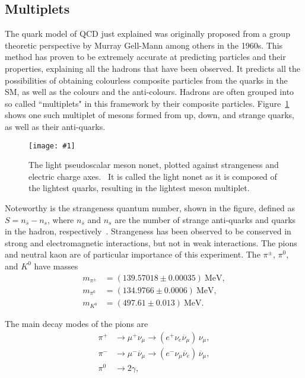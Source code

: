 \documentclass[twocolumn]{article}
\newcommand{\insertFigure}[1]{%
   \texttt{[image: \#1]}%
}
\begin{document}
\subsection{Multiplets}
The quark model of QCD just explained was originally proposed from a group theoretic perspective by Murray Gell-Mann among others in the 1960s. This method has proven to be extremely accurate at predicting particles and their properties, explaining all the hadrons that have been observed. It predicts all the possibilities of obtaining colourless composite particles from the quarks in the SM, as well as the colours and the anti-colours. Hadrons are often grouped into so called ``multiplets" in this framework by their composite particles. Figure~\ref{fig:pseudo} shows one such multiplet of mesons formed from up, down, and strange quarks, as well as their anti-quarks. 
\begin{figure}[!h]
	\centering
	\insertFigure{pseudo.png}
	\caption{The light pseudoscalar meson nonet, plotted against strangeness and electric charge axes.~\cite{pseudo} It is called the light nonet as it is composed of the lightest quarks, resulting in the lightest meson multiplet.}
	\label{fig:pseudo}
\end{figure}
Noteworthy is the strangeness quantum number, shown in the figure, defined as $S = n_{\bar{s}} - n_s$, where $n_{\bar{s}}$ and $n_s$ are the number of strange anti-quarks and quarks in the hadron, respectively~\cite{Thompson}. Strangeness has been observed to be conserved in strong and electromagnetic interactions, but not in weak interactions. The pions and neutral kaon are of particular importance of this experiment. The $\pi^{\pm}$, $\pi^0$, and $K^0$ have masses~\cite{pdg}
\begin{align*} %
m_{\pi^{\pm}} &= (139.57018 \pm 0.00035)~\text{MeV}, \\
m_{\pi^0} &= (134.9766 \pm 0.0006)~\text{MeV}, \\
m_{K^0} & = (497.61 \pm 0.013)~\text{MeV}.
\end{align*}
\iffalse
and mean lifetimes
\begin{align*} %
\tau_{\pi^{\pm}} &= (2.6033 \pm 0.0005)\times 10^{-8}~\text{s}, \\
\tau_{\pi^0} &= (8.52 \pm 0.18)\times 10^{-8}~\text{s}.
\end{align*}
Their main decay modes are 
\fi
The main decay modes of the pions are 
\begin{align*} %
\pi^+ &\to \mu^+ \nu_\mu \to (e^+ \nu_e \overline{\nu}_{\mu}) \, \nu_\mu, \\
\pi^- &\to \mu^- \overline{\nu}_\mu \to (e^- \nu_\mu \overline{\nu}_e) \, \overline{\nu}_\mu , \\
\pi^0 &\to 2\gamma,
\end{align*}
\end{document}
